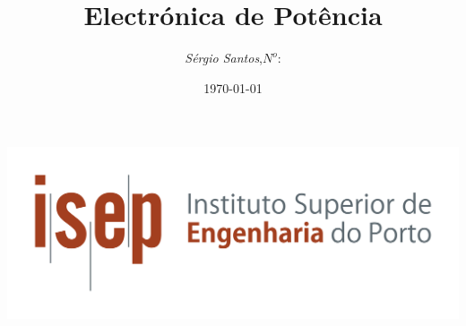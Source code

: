 \begin{titlepage}
\begin{minipage}{0.95\linewidth}
\centering
\includegraphics[scale=0.60]{./image/ISEP_marca_cor_grande.png}
\label{Capa}
\title{Electr\'{o}nica de Pot\^{e}ncia}
\author{\emph{S\'{e}rgio Santos},\;$N^o$:}
\date{\today}
\maketitle
\end{minipage}
\end{titlepage}
